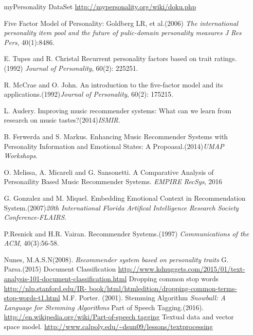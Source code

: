 
\newpage
{}
{}
\begin{thebibliography}{9}
		myPersonality DataSet \url{ http://mypersonality.org/wiki/doku.php}
	
	 Five Factor Model of Personality: Goldberg LR, et al.(2006) \textit{The international personality item pool and the future of pulic-domain personality measures J Res Pers}, 40(1):8486.
 
 E. Tupes and R. Christal Recurrent personality factors based on trait ratings.(1992) \textit{Journal of Personality}, 60(2): 225251.

 R. McCrae and O. John. An introduction to the five-factor model and its applications.(1992)\textit{Journal of Personality}, 60(2): 175215.

 L. Audery. Improving music recommender systems: What can we learn from research on music tastes?(2014)\textit{ISMIR}.

 B. Ferwerda and S. Markus. Enhancing Music Recommender Systems with Personality Information and Emotional States: A Propoasal.(2014)\textit{UMAP Workshops}.

	 O. Melissa, A. Micareli and G. Sansonetti. A Comparative Analysis of Personaility Based Music Recommender Systems. \textit{EMPIRE RecSys}, 2016

 G. Gonzalez and M. Miquel. Embedding Emotional Context in Recommendation System.(2007)\textit{20th International Florida Artifical Intelligence Research Society Conference-FLAIRS}.

 P.Resnick and H.R. Vairan. Recommender Systems.(1997) \textit{Communications of the ACM}, 40(3):56-58.

Nunes, M.A.S.N(2008). \textit{Recommender system based on personality traits}
	G. Parsa.(2015) Document Classification \url{http://www.kdnuggets.com/2015/01/text-analysis-101-document-classification.html}
	Dropping common stop words \url{http://nlp.stanford.edu/IR- book/html/htmledition/dropping-common-terms-stop-words-t1.html}
	M.F. Porter. (2001). Stemming Algorithm \textit{Snowball: A Language for Stemming Algorithms}
 Part of Speech Tagging.(2016). \url{http://en.wikipedia.org/wiki/Part-of-speech tagging}
Textual data and vector space model. \url{http://www.calpoly.edu/~dsun09/lessons/textprocessing}


\end{thebibliography}
